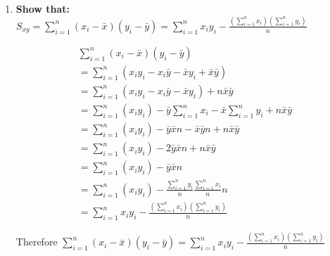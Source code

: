 \documentclass{article}
\begin{document}
\begin{enumerate}[1.]
\item
\textbf{Show that:} \\
$S_{xy} = \sum_{i=1}^{n}(x_i - \bar{x})(y_i - \bar{y}) = \sum_{i=1}^{n}x_iy_i - \frac{(\sum_{i=1}^{n}x_i)(\sum_{i=1}^{n}y_i)}{n}$

\begin{gather*}
\sum_{i=1}^{n}(x_i - \bar{x})(y_i - \bar{y}) \\
= \sum_{i = 1}^{n}(x_iy_i - x_i\bar{y} - \bar{x}y_i + \bar{x}\bar{y}) \\
= \sum_{i = 1}^{n}(x_iy_i - x_i\bar{y} - \bar{x}y_i) + n\bar{x}\bar{y} \\
= \sum_{i = 1}^{n}(x_iy_i) - \bar{y}\sum_{i=1}^{n}x_i - \bar{x}\sum_{i=1}^{n}y_i + n\bar{x}\bar{y} \\
= \sum_{i = 1}^{n}(x_iy_i) - \bar{y}\bar{x}n - \bar{x}\bar{y}n + n\bar{x}\bar{y} \\
= \sum_{i = 1}^{n}(x_iy_i) - 2\bar{y}\bar{x}n + n\bar{x}\bar{y} \\
= \sum_{i = 1}^{n}(x_iy_i) - \bar{y}\bar{x}n \\
= \sum_{i = 1}^{n}(x_iy_i) - \frac{\sum_{i=1}^{n}y_i}{n}\frac{\sum_{i=1}^{n}x_i}{n}n \\
= \sum_{i=1}^{n}x_iy_i - \frac{(\sum_{i=1}^{n}x_i)(\sum_{i=1}^{n}y_i)}{n}
\end{gather*}

Therefore $\sum_{i=1}^{n}(x_i - \bar{x})(y_i - \bar{y}) = \sum_{i=1}^{n}x_iy_i - \frac{(\sum_{i=1}^{n}x_i)(\sum_{i=1}^{n}y_i)}{n}$

\end{enumerate}
\end{document}
